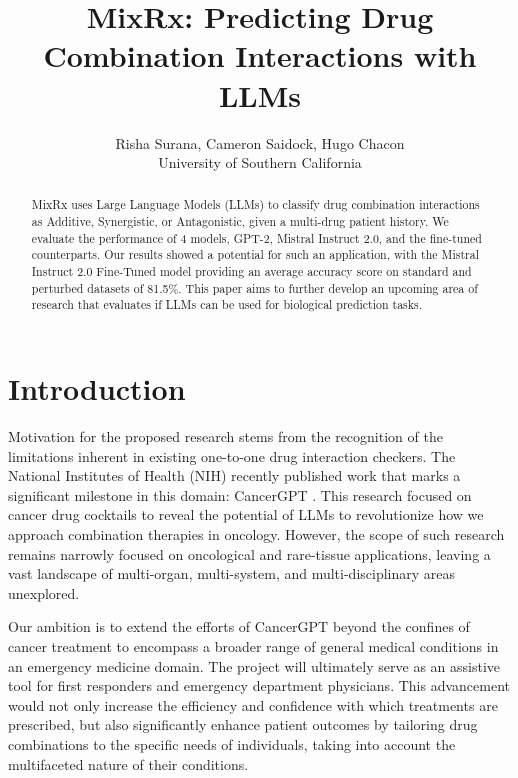 \documentclass[11pt]{article}
\title{MixRx: Predicting Drug Combination Interactions with LLMs}
\author{Risha Surana, Cameron Saidock, Hugo Chacon \\
         University of Southern California}
\begin{document}
\maketitle
\begin{abstract}
MixRx uses Large Language Models (LLMs) to classify drug combination interactions as Additive, Synergistic, or Antagonistic, given a multi-drug patient history. We evaluate the performance of 4 models, GPT-2, Mistral Instruct 2.0, and the fine-tuned counterparts. Our results showed a potential for such an application, with the Mistral Instruct 2.0 Fine-Tuned model providing an average accuracy score on standard and perturbed datasets of 81.5\%. This paper aims to further develop an upcoming area of research that evaluates if LLMs can be used for biological prediction tasks.
\end{abstract} 

\section{Introduction}
Motivation for the proposed research stems from the recognition of the limitations inherent in existing one-to-one drug interaction checkers. The National Institutes of Health (NIH) \cite{WinNT} recently published work that marks a significant milestone in this domain: CancerGPT \cite{Li2023-lq}. This research focused on cancer drug cocktails to reveal the potential of LLMs to revolutionize how we approach combination therapies in oncology. However, the scope of such research remains narrowly focused on oncological and rare-tissue applications, leaving a vast landscape of multi-organ, multi-system, and multi-disciplinary areas unexplored.

Our ambition is to extend the efforts of CancerGPT beyond the confines of cancer treatment to encompass a broader range of general medical conditions in an emergency medicine domain. The project will ultimately serve as an assistive tool for first responders and emergency department physicians. This advancement would not only increase the efficiency and confidence with which treatments are prescribed, but also significantly enhance patient outcomes by tailoring drug combinations to the specific needs of individuals, taking into account the multifaceted nature of their conditions.
\end{document}
